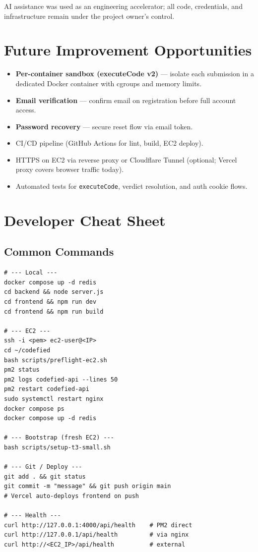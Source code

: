 \documentclass[11pt,a4paper]{article}
\begin{document}
AI assistance was used as an engineering accelerator; all code, credentials, and infrastructure remain under the project owner's control.

\section{Future Improvement Opportunities}

\begin{itemize}[noitemsep]
  \item \textbf{Per-container sandbox (executeCode v2)} --- isolate each submission in a dedicated Docker container with cgroups and memory limits.
  \item \textbf{Email verification} --- confirm email on registration before full account access.
  \item \textbf{Password recovery} --- secure reset flow via email token.
  \item CI/CD pipeline (GitHub Actions for lint, build, EC2 deploy).
  \item HTTPS on EC2 via reverse proxy or Cloudflare Tunnel (optional; Vercel proxy covers browser traffic today).
  \item Automated tests for \texttt{executeCode}, verdict resolution, and auth cookie flows.
\end{itemize}

\appendix
\section{Developer Cheat Sheet}

\subsection{Common Commands}
\begin{lstlisting}[style=terminal]
# --- Local ---
docker compose up -d redis
cd backend && node server.js
cd frontend && npm run dev
cd frontend && npm run build

# --- EC2 ---
ssh -i <pem> ec2-user@<IP>
cd ~/codefied
bash scripts/preflight-ec2.sh
pm2 status
pm2 logs codefied-api --lines 50
pm2 restart codefied-api
sudo systemctl restart nginx
docker compose ps
docker compose up -d redis

# --- Bootstrap (fresh EC2) ---
bash scripts/setup-t3-small.sh

# --- Git / Deploy ---
git add . && git status
git commit -m "message" && git push origin main
# Vercel auto-deploys frontend on push

# --- Health ---
curl http://127.0.0.1:4000/api/health    # PM2 direct
curl http://127.0.0.1/api/health         # via nginx
curl http://<EC2_IP>/api/health          # external
\end{lstlisting}
\end{document}
